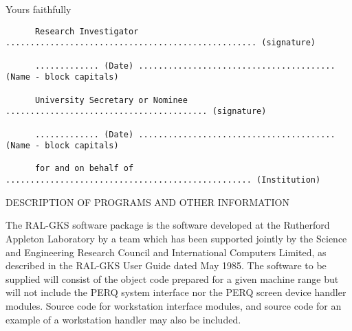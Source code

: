 \begin{footnotesize}
Yours faithfully
\begin{verbatim}
      Research Investigator ................................................... (signature)

      ............. (Date) ........................................ (Name - block capitals)

      University Secretary or Nominee ......................................... (signature)

      ............. (Date) ........................................ (Name - block capitals)

      for and on behalf of .................................................. (Institution)
\end{verbatim}
\begin{center}
DESCRIPTION OF PROGRAMS AND OTHER INFORMATION
\end{center}

The RAL-GKS software package is the software developed at the Rutherford
Appleton Laboratory by a team which has been supported jointly by the Science
and Engineering Research Council and International Computers Limited, as
described in the RAL-GKS User Guide dated May 1985. The software to be supplied
will consist of the object code prepared for a given machine range but will not
include the PERQ system interface nor the PERQ screen device handler modules.
Source code for workstation interface modules, and source code for an example
of a workstation handler may also be included.

\end{footnotesize}

